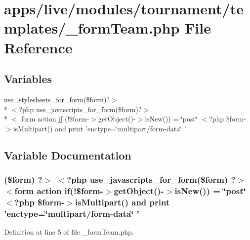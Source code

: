 \hypertarget{live_2modules_2tournament_2templates_2__form_team_8php}{\section{apps/live/modules/tournament/templates/\-\_\-form\-Team.php File Reference}
\label{live_2modules_2tournament_2templates_2__form_team_8php}
}
\subsection*{Variables}
\begin{DoxyCompactItemize}
\item 
\hyperlink{live_2modules_2user_2templates_2__form_8php_a86bc4522fdbe625b07bc4a4d6eec3df7}{use\-\_\-stylesheets\-\_\-for\-\_\-form}(\$form)?$>$\\*
$<$?php use\-\_\-javascripts\-\_\-for\-\_\-form(\$form)?$>$\\*
$<$ form action \hyperlink{live_2modules_2tournament_2templates_2__form_team_8php_ae30a307b320d8da5d9a945eaf68f7549}{if} (!\$form-\/$>$get\-Object()-\/$>$is\-New()) = \char`\"{}post\char`\"{} $<$?php \$form-\/$>$is\-Multipart() and print 'enctype=\char`\"{}multipart/form-\/data\char`\"{} '
\end{DoxyCompactItemize}


\subsection{Variable Documentation}
\hypertarget{live_2modules_2tournament_2templates_2__form_team_8php_ae30a307b320d8da5d9a945eaf68f7549}{
\subsubsection[{if}]{ (\$form) ?$>$ $<$?php use\-\_\-javascripts\-\_\-for\-\_\-form(\$form) ?$>$ $<$form action if(!\$form-\/$>$get\-Object()-\/$>$is\-New()) = \char`\"{}post\char`\"{} $<$?php \$form-\/$>$is\-Multipart() and print 'enctype=\char`\"{}multipart/form-\/data\char`\"{} '}}\label{live_2modules_2tournament_2templates_2__form_team_8php_ae30a307b320d8da5d9a945eaf68f7549}


Definition at line 5 of file \-\_\-form\-Team.\-php.

